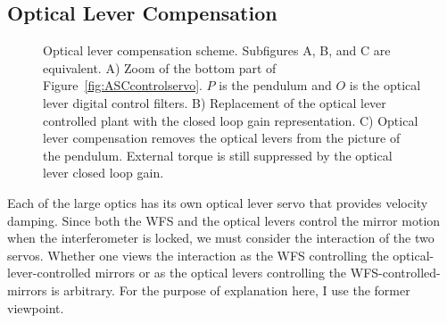 \subsection{Optical Lever Compensation}

\begin{figure} 
\begin{centering} 
\caption[Optical lever compensation scheme]{Optical lever compensation scheme. Subfigures A, B, and C are equivalent. A) Zoom of the bottom part of Figure~\ref{fig:ASCcontrolservo}. $P$ is the pendulum and $O$ is the optical lever digital control filters. B) Replacement of the optical lever controlled plant with the closed loop gain representation. C) Optical lever compensation removes the optical levers from the picture of the pendulum. External torque is still suppressed by the optical lever closed loop gain.}
\label{fig:OLcomp} 
\end{centering} 
\end{figure}

\label{sec:oplevcomp}
Each of the large optics has its own optical lever servo that provides velocity damping. Since both the WFS and the optical levers control the mirror motion when the interferometer is locked, we must consider the interaction of the two servos. Whether one views the interaction as the WFS controlling the optical-lever-controlled mirrors or as the optical levers controlling the WFS-controlled-mirrors is arbitrary. For the purpose of explanation here, I use the former viewpoint.

